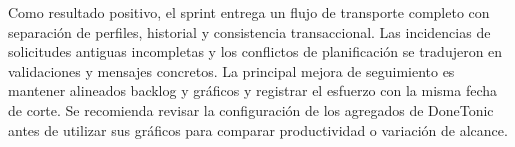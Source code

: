 Como resultado positivo, el sprint entrega un flujo de transporte completo con separación de perfiles, historial y consistencia transaccional. Las incidencias de solicitudes antiguas incompletas y los conflictos de planificación se tradujeron en validaciones y mensajes concretos. La principal mejora de seguimiento es mantener alineados backlog y gráficos y registrar el esfuerzo con la misma fecha de corte. Se recomienda revisar la configuración de los agregados de DoneTonic antes de utilizar sus gráficos para comparar productividad o variación de alcance.
